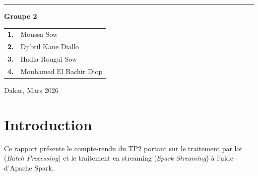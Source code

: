 \documentclass[12pt,a4paper]{report}
\begin{document}
\begin{titlepage}
\begin{center}
  \vspace{0.8cm}

  {\color{bleuESP}\rule{0.8\textwidth}{1.5pt}}

  \vspace{0.5cm}

  {\large\bfseries\color{bleuESP} Groupe 2}

  \vspace{0.4cm}

  \begin{tcolorbox}[
    colback=white,
    colframe=bleuESP,
    width=0.7\textwidth,
    rounded corners
  ]
  \centering
  \begin{tabular}{ll}
    \textbf{1.} & Moussa Sow \\[4pt]
    \textbf{2.} & Djibril Kane Diallo \\[4pt]
    \textbf{3.} & Hadia Rougui Sow \\[4pt]
    \textbf{4.} & Mouhamed El Bachir Diop \\
  \end{tabular}
  \end{tcolorbox}

\end{center}

\vfill

\noindent\colorbox{bleuESP}{\parbox{\textwidth}{
  \vspace{6pt}
  \centering
  \color{white}\normalsize Dakar, Mars 2026
  \vspace{6pt}
}}

\end{titlepage}

\newpage
\thispagestyle{fancy}

{
\hypersetup{linkcolor=bleuESP}
\tableofcontents
}

\newpage

\chapter*{Introduction}

Ce rapport présente le compte-rendu du TP2 portant sur le traitement par lot (\textit{Batch Processing}) et le traitement en streaming (\textit{Spark Streaming}) à l'aide d'Apache Spark.
\end{document}
